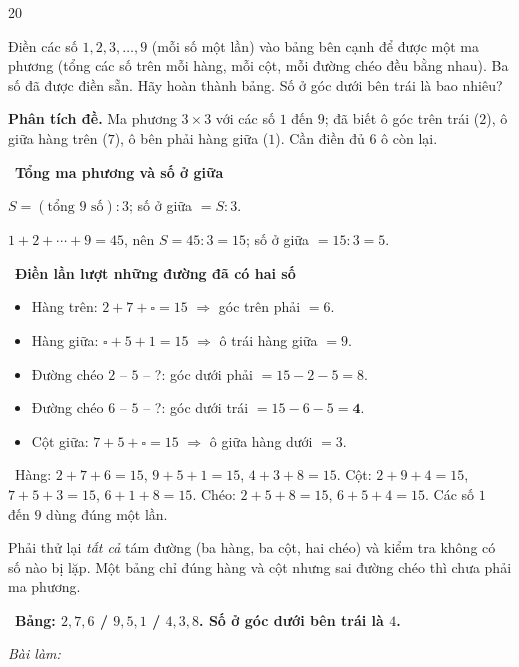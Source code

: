 \documentclass[11pt]{article}
\newif\ifsol \solfalse
\providecommand{\AnsWord}{Đáp số}
\newenvironment{probbox}[2]{\begin{probboxT}{#1}{#2}}{\end{probboxT}}
\newcommand{\StuProb}[2]{\begin{probboxS}{#1}{#2}\StuProbBody\end{probboxS}}
\newcommand{\ans}[1]{\par\smallskip{\bfseries\color{tmGreen!88!black}\AnsWord:}\ {\bfseries\color{AnsRed}#1}\par}
\newcommand{\probsol}[1]{%
  \begin{lrbox}{\solmeasure}\begin{minipage}{\dimexpr\linewidth-24pt\relax}#1\end{minipage}\end{lrbox}%
  \ifsol
    \begin{solbox}#1\end{solbox}%
  \else
    \setlength{\solht}{\dimexpr\ht\solmeasure+\dp\solmeasure+0.85cm\relax}%
    \ifdim\solht<1.35cm\setlength{\solht}{1.35cm}\fi
    \ifdim\solht>\StudentMaxWork\setlength{\solht}{\StudentMaxWork}\fi
    \par\noindent\begin{minipage}{\linewidth}%
    \expandafter\StuProb\StuProbArgs
    \begin{tcolorbox}[colback=white,colframe=Line,boxrule=0.8pt,arc=5pt,
      left=8pt,right=8pt,top=4pt,bottom=4pt,height=\solht]{\footnotesize\color{Slate}\itshape\WorkWord}\end{tcolorbox}%
    \end{minipage}\par\medskip
  \fi}
\newlength{\StudentMaxWork}\setlength{\StudentMaxWork}{4.5cm}
\newcommand{\step}[2]{\par\smallskip\noindent{\bfseries\color{tmBlue!85!black}\StepWord~#1.}\ {\bfseries #2}\par\nopagebreak}
\newcommand{\verify}[1]{\par\smallskip\noindent{\bfseries\color{tmGreen!80!black}\faCheckCircle\ \CheckWord}\ #1\par}
\def\WorkWord{Bài làm:}
\def\AnsWord{Đáp số}
\def\StepWord{Bước}
\def\CheckWord{Thử lại:}
\begin{document}
\begin{probbox}{20}{\relax}
\begin{minipage}[t]{0.63\linewidth}
Điền các số $1, 2, 3, \ldots, 9$ (mỗi số một lần) vào bảng bên cạnh để được một ma phương (tổng các số trên mỗi hàng, mỗi cột, mỗi đường
chéo đều bằng nhau). Ba số đã được điền sẵn. Hãy hoàn thành bảng. Số ở góc dưới bên trái là bao nhiêu?
\end{minipage}\hfill
\begin{minipage}[t]{0.33\linewidth}\vspace{-4pt}\centering
{}
\end{minipage}
\end{probbox}
\probsol{
\textbf{Phân tích đề.} Ma phương $3\times 3$ với các số $1$ đến $9$; đã biết ô góc trên trái ($2$), ô giữa hàng trên ($7$), ô bên phải
hàng giữa ($1$). Cần điền đủ $6$ ô còn lại.
\step{1}{Tổng ma phương và số ở giữa}
\begin{recallbox}$S = (\text{tổng } 9 \text{ số}) : 3$; số ở giữa $= S : 3$.\end{recallbox}
$1 + 2 + \cdots + 9 = 45$, nên $S = 45 : 3 = 15$; số ở giữa $= 15 : 3 = 5$.
\step{2}{Điền lần lượt những đường đã có hai số}
\begin{itemize}[leftmargin=1.4em,itemsep=1pt,topsep=1pt]
\item Hàng trên: $2 + 7 + \square = 15$ $\Rightarrow$ góc trên phải $= 6$.
\item Hàng giữa: $\square + 5 + 1 = 15$ $\Rightarrow$ ô trái hàng giữa $= 9$.
\item Đường chéo $2$ -- $5$ -- ?: góc dưới phải $= 15 - 2 - 5 = 8$.
\item Đường chéo $6$ -- $5$ -- ?: góc dưới trái $= 15 - 6 - 5 = \mathbf{4}$.
\item Cột giữa: $7 + 5 + \square = 15$ $\Rightarrow$ ô giữa hàng dưới $= 3$.
\end{itemize}
\begin{center}\lgaMagic{$2$}{$7$}{\textcolor{tmGreen!60!black}{$6$}}{\textcolor{tmGreen!60!black}{$9$}}{\textcolor{tmGreen!60!black}{$5$}}{$1$}{\textcolor{AnsRed}{$\mathbf{4}$}}{\textcolor{tmGreen!60!black}{$3$}}{\textcolor{tmGreen!60!black}{$8$}}\end{center}
\verify{Hàng: $2 + 7 + 6 = 15$, $9 + 5 + 1 = 15$, $4 + 3 + 8 = 15$. Cột: $2 + 9 + 4 = 15$, $7 + 5 + 3 = 15$, $6 + 1 + 8 = 15$.
Chéo: $2 + 5 + 8 = 15$, $6 + 5 + 4 = 15$. Các số $1$ đến $9$ dùng đúng một lần.}
\begin{warnbox}Phải thử lại \emph{tất cả} tám đường (ba hàng, ba cột, hai chéo) và kiểm tra không có số nào bị lặp. Một bảng chỉ đúng
hàng và cột nhưng sai đường chéo thì chưa phải ma phương.\end{warnbox}
\ans{Bảng: $2, 7, 6$ / $9, 5, 1$ / $4, 3, 8$. Số ở góc dưới bên trái là $4$.}
}
\end{document}
